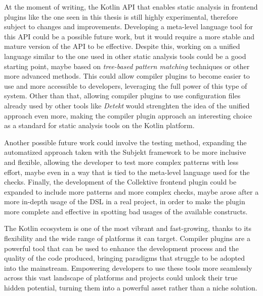\documentclass[12pt,a4paper,openright,twoside]{book}
\begin{document}
At the moment of writing, the Kotlin API that enables static analysis in
frontend plugins like the one seen in this thesis is still highly experimental,
therefore subject to changes and improvements. Developing a meta-level language
tool for this API could be a possible future work, but it would require a more
stable and mature version of the API to be effective.
%
Despite this, working on a unified language similar to the one used in other
static analysis tools could be a good starting point, maybe based on
\emph{tree-based pattern matching} techniques or other more advanced methods.
This could allow compiler plugins to become easier to use and more accessible
to developers, leveraging the full power of this type of system. 
%
Other than that, allowing compiler plugins to use configuration files already
used by other tools like \emph{Detekt} would strenghten the idea of the unified
approach even more, making the compiler plugin approach an interesting choice 
as a standard for static analysis tools on the Kotlin platform.

Another possible future work could involve the testing method, expanding the
automatized approach taken with the Subjekt framework to be more inclusive and
flexible, allowing the developer to test more complex patterns with less effort,
maybe even in a way that is tied to the meta-level language used for the checks.
%
Finally, the development of the Collektive frontend plugin could be expanded to
include more patterns and more complex checks, maybe arose after a more in-depth
usage of the \ac{DSL} in a real project, in order to make the plugin more
complete and effective in spotting bad usages of the available constructs.

The Kotlin ecosystem is one of the most vibrant and fast-growing, thanks to its
flexibility and the wide range of platforms it can target. Compiler plugins are
a powerful tool that can be used to enhance the development process and the
quality of the code produced, bringing paradigms that struggle to be adopted
into the mainstream. 
%
Empowering developers to use these tools more seamlessly across this vast
landscape of platforms and projects could unlock their true hidden potential,
turning them into a powerful asset rather than a niche solution.



\backmatter
\end{document}
